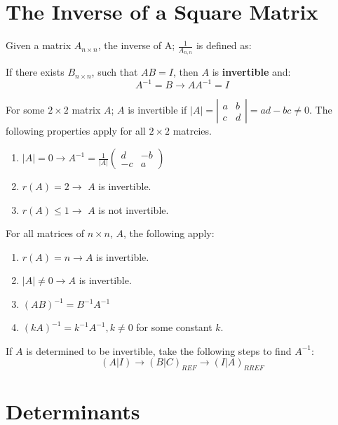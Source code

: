 \documentclass[a4paper]{article}
\begin{document}
  \section{The Inverse of a Square Matrix} \label{sqmat}
  Given a matrix $A_{n\times n}$, the inverse of A; $\frac{1 }{A_{n,n}}$ is defined as:
  \begin{defn}
    If there exists $B_{n\times n}$, such that $AB=I$, then $A$ is \textbf{invertible} and:
    \[
      A^{-1}=B\rightarrow AA^{-1} = I
    \]
  \end{defn}
  \noindent
  For some $2\times 2$ matrix $A$; $A$ is invertible if $|A| = |\begin{smallmatrix} a & b \\ c & d \end{smallmatrix}| = ad - bc \neq 0$. The following properties apply for all $2\times 2$ matrcies.
  \begin{enumerate}
    \item $|A| = 0 \rightarrow A^{-1} = \frac{1 }{|A|} \begin{pmatrix}
        d & -b \\
        -c & a
    \end{pmatrix}$
  \item $r(A) = 2 \rightarrow$ $A$ is invertible.
  \item $r(A) \le 1 \rightarrow$ $A$ is not invertible.
  \end{enumerate}
  For all matrices of $n \times n$, $A$, the following apply:
  \begin{enumerate}
    \item $r(A) = n \rightarrow A$ is invertible.
    \item $|A| \neq 0 \rightarrow A$ is invertible.
    \item $(AB)^{-1} = B^{-1}A^{-1}$
    \item $(kA)^{-1} = k^{-1}A^{-1}, k \neq 0$ for some constant $k$.
  \end{enumerate}
  If $A$ is determined to be invertible, take the following steps to find $A^{-1}$:
  \[
    (A|I) \rightarrow (B|C)_{REF} \rightarrow (I|A)_{RREF}
  \]
  \section{Determinants} 
\end{document}
